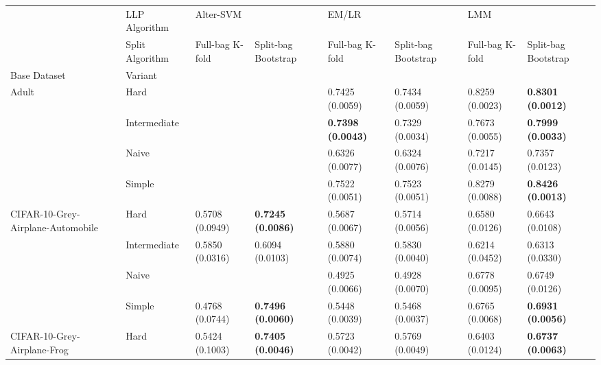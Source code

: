 \begin{tabular}{llllllll}
\toprule
                 & LLP Algorithm & \multicolumn{2}{l}{Alter-SVM} & \multicolumn{2}{l}{EM/LR} & \multicolumn{2}{l}{LMM} \\
                 & Split Algorithm &  Full-bag K-fold &       Split-bag Bootstrap &           Full-bag K-fold &       Split-bag Bootstrap &           Full-bag K-fold &       Split-bag Bootstrap \\
Base Dataset & Variant &                  &                           &                           &                           &                           &                           \\
\midrule
Adult & Hard &                  &                           &           0.7425 (0.0059) &           0.7434 (0.0059) &           0.8259 (0.0023) &  \textbf{0.8301 (0.0012)} \\
                 & Intermediate &                  &                           &  \textbf{0.7398 (0.0043)} &           0.7329 (0.0034) &           0.7673 (0.0055) &  \textbf{0.7999 (0.0033)} \\
                 & Naive &                  &                           &           0.6326 (0.0077) &           0.6324 (0.0076) &           0.7217 (0.0145) &           0.7357 (0.0123) \\
                 & Simple &                  &                           &           0.7522 (0.0051) &           0.7523 (0.0051) &           0.8279 (0.0088) &  \textbf{0.8426 (0.0013)} \\
CIFAR-10-Grey-Airplane-Automobile & Hard &  0.5708 (0.0949) &  \textbf{0.7245 (0.0086)} &           0.5687 (0.0067) &           0.5714 (0.0056) &           0.6580 (0.0126) &           0.6643 (0.0108) \\
                 & Intermediate &  0.5850 (0.0316) &           0.6094 (0.0103) &           0.5880 (0.0074) &           0.5830 (0.0040) &           0.6214 (0.0452) &           0.6313 (0.0330) \\
                 & Naive &                  &                           &           0.4925 (0.0066) &           0.4928 (0.0070) &           0.6778 (0.0095) &           0.6749 (0.0126) \\
                 & Simple &  0.4768 (0.0744) &  \textbf{0.7496 (0.0060)} &           0.5448 (0.0039) &           0.5468 (0.0037) &           0.6765 (0.0068) &  \textbf{0.6931 (0.0056)} \\
CIFAR-10-Grey-Airplane-Frog & Hard &  0.5424 (0.1003) &  \textbf{0.7405 (0.0046)} &           0.5723 (0.0042) &           0.5769 (0.0049) &           0.6403 (0.0124) &  \textbf{0.6737 (0.0063)} \\

\end{tabular}
